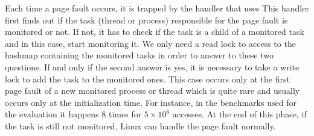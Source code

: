 

Each time a page fault occurs, it is trapped by the \Moca handler that uses
This handler first finds out if the task
(thread or process) responsible for the page fault is
monitored or not. If not, it has to check if the task is a child of a monitored
task and in this case, start monitoring it. We only need a read lock
to access to the hashmap containing the monitored tasks in order to answer to these
two questions.
If and only if the second answer is yes, it is necessary to take
a write lock to add the task to the monitored ones.
This case occurs only at the first page fault of a new monitored
process or thread which is quite rare and usually occurs only at the
initialization time. For instance, in the benchmarks used for
the evaluation it happens $8$ times for $5\times10^6$ accesses.
At the end of this phase, if the task is still not monitored, Linux can handle the page fault normally.

